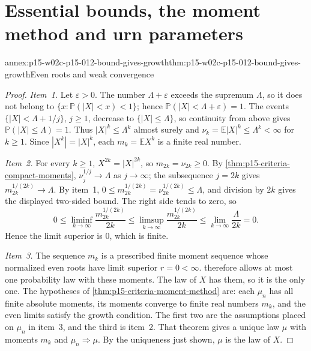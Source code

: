 \section{Essential bounds, the moment method and urn parameters}
\label{sec:annex-p15-w02c-p15-012-bounds-and-urns}

\begin{annexitem}{annex:p15-w02c-p15-012-bound-gives-growth}{thm:p15-w02c-p15-012-bound-gives-growth}{Even roots and weak convergence}
\begin{proof}
\emph{Item~1.} Let \(\varepsilon>0\). The number \(\Lambda+\varepsilon\)
exceeds the supremum \(\Lambda\), so it does not belong to
\(\{x:\mathbb P(|X|<x)<1\}\); hence
\(\mathbb P(|X|<\Lambda+\varepsilon)=1\). The events
\(\{|X|<\Lambda+1/j\}\), \(j\geq1\), decrease to \(\{|X|\leq\Lambda\}\),
so continuity from above gives \(\mathbb P(|X|\leq\Lambda)=1\).
Thus \(|X|^k\leq\Lambda^k\) almost surely and
\(\nu_k=\mathbb E|X|^k\leq\Lambda^k<\infty\) for \(k\geq1\).
Since \(|X^k|=|X|^k\), each \(m_k=\mathbb EX^k\) is a finite real number.

\emph{Item~2.} For every \(k\geq1\), \(X^{2k}=|X|^{2k}\), so
\(m_{2k}=\nu_{2k}\geq0\). By \cref{thm:p15-criteria-compact-moments},
\(\nu_j^{1/j}\to\Lambda\) as \(j\to\infty\); the subsequence
\(j=2k\) gives \(m_{2k}^{1/(2k)}\to\Lambda\). By item~1,
\(0\leq m_{2k}^{1/(2k)}=\nu_{2k}^{1/(2k)}\leq\Lambda\), and division by
\(2k\) gives the displayed two-sided bound. The right side tends to
zero, so
\[
 0\leq\liminf_{k\to\infty}\frac{m_{2k}^{1/(2k)}}{2k}
  \leq\limsup_{k\to\infty}\frac{m_{2k}^{1/(2k)}}{2k}
  \leq\lim_{k\to\infty}\frac{\Lambda}{2k}=0 .
\]
Hence the limit superior is \(0\), which is finite.

\emph{Item~3.} The sequence \(m_k\) is a prescribed finite moment sequence
whose normalized even roots have limit superior \(r=0<\infty\).
 therefore allows at most one
probability law with these moments. The law of \(X\) has them, so it is
the only one. The hypotheses of \cref{thm:p15-criteria-moment-method}
are: each \(\mu_n\) has all finite absolute moments, its moments converge
to finite real numbers \(m_k\), and the even limits satisfy the growth
condition. The first two are the assumptions placed on \(\mu_n\) in
item~3, and the third is item~2. That theorem gives a unique law \(\mu\)
with moments \(m_k\) and \(\mu_n\Rightarrow\mu\). By the uniqueness just
shown, \(\mu\) is the law of \(X\).


\end{proof}
\end{annexitem}
